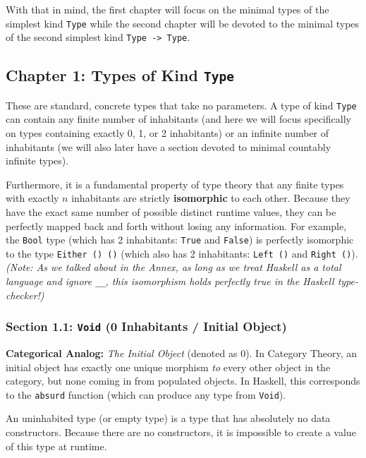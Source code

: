 \documentclass[
]{article}
\begin{document}
With that in mind, the first chapter will focus on the minimal types of
the simplest kind \texttt{Type} while the second chapter will be devoted
to the minimal types of the second simplest kind
\texttt{Type\ -\textgreater{}\ Type}.

\subsection{\texorpdfstring{Chapter 1: Types of Kind
\texttt{Type}}{Chapter 1: Types of Kind Type}}\label{chapter-1-types-of-kind-type}

These are standard, concrete types that take no parameters. A type of
kind \texttt{Type} can contain any finite number of inhabitants (and
here we will focus specifically on types containing exactly 0, 1, or 2
inhabitants) or an infinite number of inhabitants (we will also later
have a section devoted to minimal countably infinite types).

Furthermore, it is a fundamental property of type theory that any finite
types with exactly \(n\) inhabitants are strictly \textbf{isomorphic} to
each other. Because they have the exact same number of possible distinct
runtime values, they can be perfectly mapped back and forth without
losing any information. For example, the \texttt{Bool} type (which has 2
inhabitants: \texttt{True} and \texttt{False}) is perfectly isomorphic
to the type \texttt{Either\ ()\ ()} (which also has 2 inhabitants:
\texttt{Left\ ()} and \texttt{Right\ ()}). \emph{(Note: As we talked
about in the Annex, as long as we treat Haskell as a total language and
ignore \texttt{\_\textbar{}\_}, this isomorphism holds perfectly true in
the Haskell type-checker!)}

\subsubsection{\texorpdfstring{Section 1.1: \texttt{Void} (0 Inhabitants
/ Initial
Object)}{Section 1.1: Void (0 Inhabitants / Initial Object)}}\label{section-1.1-void-0-inhabitants-initial-object}

\textbf{Categorical Analog:} \emph{The Initial Object} (denoted as
\(0\)). In Category Theory, an initial object has exactly one unique
morphism \emph{to} every other object in the category, but none coming
in from populated objects. In Haskell, this corresponds to the
\texttt{absurd} function (which can produce any type from
\texttt{Void}).

An uninhabited type (or empty type) is a type that has absolutely no
data constructors. Because there are no constructors, it is impossible
to create a value of this type at runtime.
\end{document}
